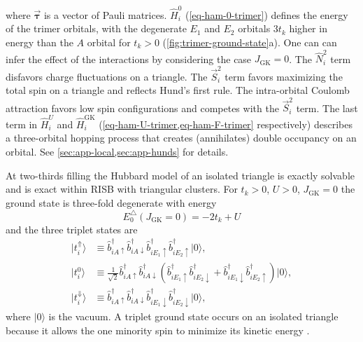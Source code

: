 \documentclass[reprint,aps,prb,amsmath,amssymb]{revtex4-2}
\begin{document}
%
where $\vec{\bm{\tau}}$ is a vector of Pauli matrices. $\hat{H}_i^0$ (\cref{eq-ham-0-trimer}) defines the energy of the trimer orbitals, with the degenerate $E_1$ and $E_2$ orbitals $3t_k$ higher in energy than the $A$ orbital for $t_k >0$ (\cref{fig:trimer-ground-state}a). One can can infer the effect of the interactions by considering the case $J_{\mathrm{GK}} = 0$. The $\hat{N}_i^2$ term disfavors charge fluctuations on a triangle. The $\vec{S}_i^2$ term favors maximizing the total spin on a triangle and reflects Hund's first rule. The intra-orbital Coulomb attraction favors low spin configurations and competes with the $\vec{S}_i^2$ term. The last term in $\hat{H}_i^U$ and $\hat{H}_i^{\mathrm{GK}}$ (\cref{eq-ham-U-trimer,eq-ham-F-trimer} respectively) describes a three-orbital hopping process that creates (annihilates) double occupancy on an orbital. See \cref{sec:app-local,sec:app-hunds} for details.

At two-thirds filling the Hubbard model of an isolated triangle is exactly solvable and is exact within RISB with triangular clusters. For $t_k >0$, $U > 0$, $J_{\mathrm{GK}} = 0$ the ground state is three-fold degenerate with energy 
%
\begin{equation} \label{eq:energy-isolated-triangle}
E_0^{\triangle}(J_{\mathrm{GK}} = 0) = -2t_k + U
\end{equation}
%
and %
%
%
the three triplet states are \cite{Janani2014a}
%
\begin{align}
	|t_i^{\Uparrow} \rangle & \equiv \hat{b}_{iA\uparrow}^{\dagger} \hat{b}_{iA\downarrow}^{\dagger} \hat{b}_{iE_1\uparrow}^{\dagger} \hat{b}_{iE_2\uparrow}^{\dagger} |0 \rangle, \nonumber \\
	|t_i^0 \rangle& \equiv \frac{1}{\sqrt{2}} \hat{b}_{iA\uparrow}^{\dagger} \hat{b}_{iA\downarrow}^{\dagger} \left( \hat{b}_{iE_1\uparrow}^{\dagger} \hat{b}_{iE_2\downarrow}^{\dagger} + \hat{b}_{iE_1\downarrow}^{\dagger} \hat{b}_{iE_2\uparrow}^{\dagger} \right) |0 \rangle, \nonumber \\
	|t_i^{\Downarrow} \rangle & \equiv \hat{b}_{iA\uparrow}^{\dagger} \hat{b}_{iA\downarrow}^{\dagger} \hat{b}_{iE_1\downarrow}^{\dagger} \hat{b}_{iE_2\downarrow}^{\dagger} |0 \rangle,
\end{align}
%
where $|0\rangle$ is the vacuum. A triplet ground state occurs on an isolated triangle because it allows the one minority spin to minimize its kinetic energy \cite{Janani2014a}.
\end{document}
